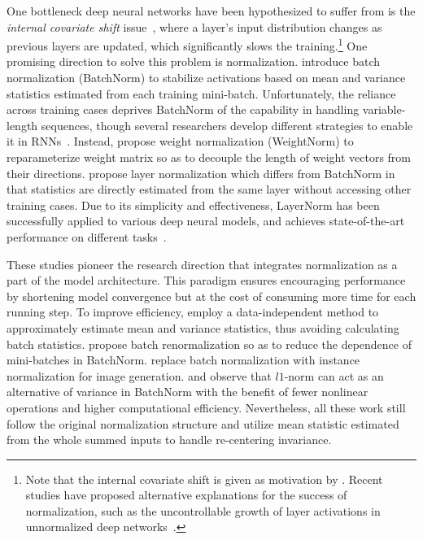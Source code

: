 One bottleneck deep neural networks have been hypothesized to suffer from is the \textit{internal covariate shift} issue~\cite{CIS-166708}, where a layer's input distribution changes as previous layers are updated, which significantly slows the training.\footnote{Note that the internal covariate shift is given as motivation by \cite{Ioffe:2015:BNA:3045118.3045167,ba2016layer}. Recent studies have proposed alternative explanations for the success of normalization, such as the uncontrollable growth of layer activations in unnormalized deep networks~\cite{NIPS2018_7996}.} One promising direction to solve this problem is normalization. \citet{Ioffe:2015:BNA:3045118.3045167} introduce batch normalization (BatchNorm) to stabilize activations based on mean and variance statistics estimated from each training mini-batch. Unfortunately, the reliance across training cases deprives BatchNorm of the capability in handling variable-length sequences, though several researchers develop different strategies to enable it in RNNs~\cite{laurent2016batch,cooijmans2016recurrent}. Instead, \citet{NIPS2016_6114} propose weight normalization (WeightNorm) to reparameterize weight matrix so as to decouple the length of weight vectors from their directions. \citet{ba2016layer} propose layer normalization which differs from BatchNorm in that statistics are directly estimated from the same layer without accessing other training cases. Due to its simplicity and effectiveness, LayerNorm has been successfully applied to various deep neural models, and achieves state-of-the-art performance on different tasks~\cite{parmar2018image,zhou2018syllable,NIPS2017_7181,P18-1008}.

These studies pioneer the research direction that integrates normalization as a part of the model architecture. This paradigm ensures encouraging performance by shortening model convergence but at the cost of consuming more time for each running step. To improve efficiency, \citet{arpit2016normalization} employ a data-independent method to approximately estimate mean and variance statistics, thus avoiding calculating batch statistics. \citet{ioffe2017batch} propose batch renormalization so as to reduce the dependence of mini-batches in BatchNorm. \citet{DBLP:journals/corr/UlyanovVL16} replace batch normalization with instance normalization for image generation. \citet{hoffer2018norm} and \citet{wu2018l1} observe that $l1$-norm can act as an alternative of variance in BatchNorm with the benefit of fewer nonlinear operations and higher computational efficiency. Nevertheless, all these work still follow the original normalization structure and utilize mean statistic estimated from the whole summed inputs to handle re-centering invariance.

